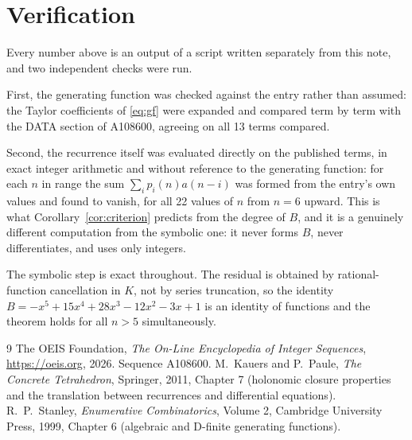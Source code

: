 \documentclass[11pt,a4paper]{article}
\theoremstyle{plain}
\theoremstyle{definition}
\begin{document}
\section{Verification}

Every number above is an output of a script written separately from this note, and two
independent checks were run.

First, the generating function was checked against the entry rather than assumed: the
Taylor coefficients of \eqref{eq:gf} were expanded and compared term by term with the DATA
section of A108600, agreeing on all 13 terms compared.

Second, the recurrence itself was evaluated directly on the published terms, in exact
integer arithmetic and without reference to the generating function: for each $n$ in range
the sum $\sum_{i}p_{i}(n)a(n-i)$ was formed from the entry's own values and found to
vanish, for all 22 values of $n$ from $n=6$ upward. This is what
Corollary~\ref{cor:criterion} predicts from the degree of $B$, and it is a genuinely
different computation from the symbolic one: it never forms $B$, never differentiates, and
uses only integers.

The symbolic step is exact throughout. The residual is obtained by rational-function
cancellation in $K$, not by series truncation, so the identity $B=- x^{5} + 15 x^{4} + 28 x^{3} - 12 x^{2} - 3 x + 1$ is an
identity of functions and the theorem holds for all $n>5$ simultaneously.

\begin{thebibliography}{9}
 The OEIS Foundation, \emph{The On-Line Encyclopedia of Integer Sequences},
\url{https://oeis.org}, 2026. Sequence A108600.
 M.~Kauers and P.~Paule, \emph{The Concrete Tetrahedron}, Springer, 2011,
Chapter 7 (holonomic closure properties and the translation between recurrences and
differential equations).
 R.~P.~Stanley, \emph{Enumerative Combinatorics}, Volume 2, Cambridge
University Press, 1999, Chapter 6 (algebraic and D-finite generating functions).
\end{thebibliography}
\end{document}
